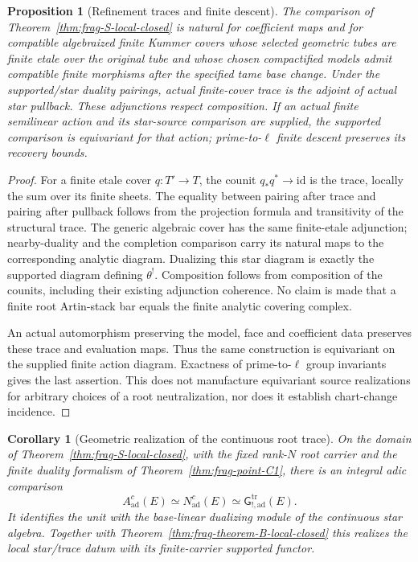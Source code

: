 \documentclass[11pt]{article}
\newtheorem{proposition}[theorem]{Proposition}
\newtheorem{corollary}[theorem]{Corollary}
\theoremstyle{definition}
\theoremstyle{remark}
\begin{document}
\begin{proposition}[Refinement traces and finite descent]
\label{prop:frag-S-trace-naturality}
The comparison of Theorem~\ref{thm:frag-S-local-closed} is natural for
coefficient maps and for compatible algebraized finite Kummer covers
whose selected geometric tubes are finite etale over the original tube
and whose chosen compactified models admit compatible finite morphisms
after the specified tame base change.
Under the supported/star duality pairings, actual finite-cover trace is
the adjoint of actual star pullback.  These adjunctions respect
composition.  If an actual finite semilinear action and its star-source
comparison are supplied, the supported comparison is equivariant for
that action; prime-to-$\ell$ finite descent preserves its recovery bounds.
\end{proposition}

\begin{proof}
For a finite etale cover $q:T'\to T$, the counit
$q_*q^*\to\mathrm{id}$ is the trace, locally the sum over its finite
sheets.  The equality between pairing after trace and pairing after
pullback follows from the projection formula and transitivity of the
structural trace.  The generic algebraic cover has the same finite-etale
adjunction; nearby-duality and the completion comparison carry its
natural maps to the corresponding analytic diagram.  Dualizing this
star diagram is exactly the supported diagram defining $\theta^!$.
Composition follows from composition of the counits, including their
existing adjunction coherence.  No claim is made that a finite root
Artin-stack bar equals the finite analytic covering complex.

An actual automorphism preserving the model, face and coefficient data
preserves these trace and evaluation maps.  Thus the same construction
is equivariant on the supplied finite action diagram.  Exactness of
prime-to-$\ell$ group invariants gives the last assertion.  This does
not manufacture equivariant source realizations for arbitrary choices
of a root neutralization, nor does it establish chart-change incidence.
\end{proof}

\begin{corollary}[Geometric realization of the continuous root trace]
\label{cor:frag-C2-local-closed}
On the domain of Theorem~\ref{thm:frag-S-local-closed}, with the fixed
rank-$N$ root carrier and the finite duality formalism of Theorem~\ref{thm:frag-point-C1}, there is
an integral adic comparison
\[
 A^c_{\mathrm{ad}}(E)\simeq N^c_{\mathrm{ad}}(E)
                  \simeq\mathsf G_{!,\mathrm{ad}}^{\mathrm{tr}}(E).
\]
It identifies the unit with the base-linear dualizing module of the
continuous star algebra.  Together with Theorem~\ref{thm:frag-theorem-B-local-closed} this realizes
the local star/trace datum with its finite-carrier supported functor.
\end{corollary}
\end{document}

